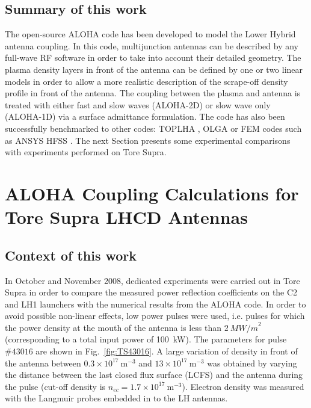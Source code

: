 \subsection{Summary of this work}
The open-source ALOHA code has been developed to model the Lower Hybrid antenna coupling. In this code, multijunction antennas can be described by any full-wave RF software in order to take into account their detailed geometry. The plasma density layers in front of the antenna can be defined by one or two linear models in order to allow a more realistic description of the scrape-off density profile in front of the antenna. The coupling between the plasma and antenna is treated with either fast and slow waves (ALOHA-2D) or slow wave only (ALOHA-1D) via a surface admittance formulation. The code has also been successfully benchmarked to other codes: TOPLHA , OLGA  or FEM codes such as ANSYS HFSS . The next Section presents some experimental comparisons with experiments performed on Tore Supra.

\clearpage

\section{ALOHA Coupling Calculations for Tore Supra LHCD Antennas}\label{sec:ALOHA_TS}
\subsection{Context of this work}
In October and November 2008, dedicated experiments were carried out in Tore Supra in order to compare the measured power reflection coefficients on the C2 and LH1 launchers with the numerical results from the ALOHA code. In order to avoid possible non-linear effects\cite{petrzilka1987, ekedahl2009}, low power pulses were used, i.e. pulses for which the power density at the mouth of the antenna is less than $2~\si{MW/m}^2$ (corresponding to a total input power of 100~kW). The parameters for pulse $\#43016$ are shown in Fig.~\ref{fig:TS43016}. A large variation of density in front of the antenna between $0.3\times10^{17}~\mathrm{m}^{-3}$ and $13\times10^{17}~\mathrm{m}^{-3}$ was obtained by varying the distance between the last closed flux surface (LCFS) and the antenna during the pulse (cut-off density is $n_{ec}=1.7\times10^{17}~\mathrm{m}^{-3}$). Electron density was measured with the Langmuir probes embedded in to the LH antennas. 

